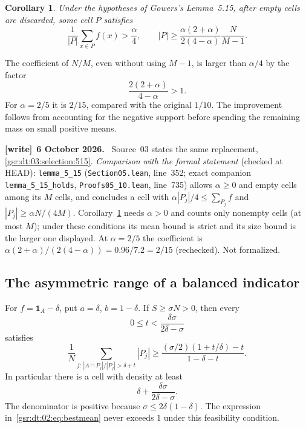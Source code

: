 \documentclass[11pt,letterpaper]{article}
\numberwithin{equation}{section}
\newtheorem{corollary}[theorem]{Corollary}
\theoremstyle{definition}
\theoremstyle{remark}
\newcommand{\one}{\mathbf 1}
\newcommand{\1}{\mathbf 1}
\newcommand{\file}[1]{\nolinkurl{#1}}
\newenvironment{writenote}[1][]{\par\smallskip\begingroup\small
 \noindent\textbf{[write]}\if\relax\detokenize{#1}\relax\else~\textbf{#1.}\fi\ }%
 {\par\endgroup\smallskip}
\begin{document}
\begin{corollary}\label{gsr:dt:02:cor:515}
Under the hypotheses of Gowers's Lemma~5.15, after empty cells are discarded, some cell $P$ satisfies
\begin{equation}\label{gsr:dt:02:eq:515new}
 \frac1{|P|}\sum_{x\in P}f(x)>\frac\alpha4,
 \qquad
 |P|\geq\frac{\alpha(2+\alpha)}{2(4-\alpha)}\frac{N}{M-1}.
\end{equation}
\end{corollary}
The coefficient of $N/M$, even without using $M-1$, is larger than $\alpha/4$ by the factor
\[
 \frac{2(2+\alpha)}{4-\alpha}>1.
\]
For $\alpha=2/5$ it is $2/15$, compared with the original $1/10$. The improvement follows from accounting for the negative support before spending the remaining mass on small positive means.
\begin{writenote}[6 October 2026]
Source~03 states the same replacement, \eqref{gsr:dt:03:selection:515}. \emph{Comparison with the formal statement} (checked at HEAD): \file{lemma_5_15} (\file{Section05.lean}, line~352; exact companion \file{lemma_5_15_holds}, \file{Proofs05\_10.lean}, line~735) allows $\alpha\ge0$ and empty cells among its $M$ cells, and concludes a cell with $\alpha|P_j|/4\le\sum_{P_j}f$ and $|P_j|\ge\alpha N/(4M)$. Corollary~\ref{gsr:dt:02:cor:515} needs $\alpha>0$ and counts only nonempty cells (at most $M$); under these conditions its mean bound is strict and its size bound is the larger one displayed. At $\alpha=2/5$ the coefficient is $\alpha(2+\alpha)/(2(4-\alpha))=0.96/7.2=2/15$ (rechecked). Not formalized.
\end{writenote}

\subsection{The asymmetric range of a balanced indicator}
For $f=\one_A-\delta$, put $a=\delta$, $b=1-\delta$. If $S\geq\sigma N>0$, then every
\[
 0\leq t<\frac{\delta\sigma}{2\delta-\sigma}
\]
satisfies
\begin{equation}\label{gsr:dt:02:eq:balancedtail}
 \frac1N\sum_{j:\,|A\cap P_j|/|P_j|>\delta+t}|P_j|
 \geq
 \frac{(\sigma/2)(1+t/\delta)-t}{1-\delta-t}.
\end{equation}
In particular there is a cell with density at least
\begin{equation}\label{gsr:dt:02:eq:bestmean}
 \delta+\frac{\delta\sigma}{2\delta-\sigma}.
\end{equation}
The denominator is positive because $\sigma\leq2\delta(1-\delta)$. The expression in~\eqref{gsr:dt:02:eq:bestmean} never exceeds $1$ under this feasibility condition.
\end{document}
